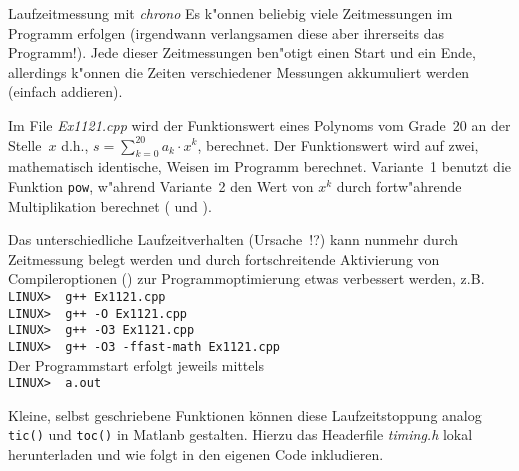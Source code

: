 %
{Laufzeitmessung mit \emph{chrono}}
%
Es k"onnen beliebig viele Zeitmessungen im Programm erfolgen 
(irgendwann verlangsamen diese aber ihrerseits das Programm!). 
Jede dieser Zeitmessungen ben"otigt einen Start und ein Ende, 
allerdings k"onnen die Zeiten verschiedener Messungen 
akkumuliert werden (einfach addieren).

Im File \textit{Ex1121.cpp}  
wird der Funktionswert eines Polynoms vom Grade~20 
an der Stelle~$x$ d.h., 
$s = \sum_{k=0}^{20} a_k \cdot x^k$, berechnet. 
Der Funktionswert wird auf zwei, mathematisch identische, Weisen im Programm berechnet. 
Variante~1 benutzt die Funktion \verb|pow|, w"ahrend 
Variante~2 den Wert von $x^k$ durch fortw"ahrende Multiplikation berechnet 
( und 
).  

Das unterschiedliche Laufzeitverhalten (Ursache~!?)
kann nunmehr durch 
Zeitmessung belegt werden und durch fortschreitende Aktivierung 
von Compileroptionen () 
zur Pro\-gramm\-op\-ti\-mie\-rung etwas verbessert werden, z.B. 
\\[0.5ex]
\verb|LINUX>  g++ Ex1121.cpp|	\\
\verb|LINUX>  g++ -O Ex1121.cpp|	\\
\verb|LINUX>  g++ -O3 Ex1121.cpp|	\\
\verb|LINUX>  g++ -O3 -ffast-math Ex1121.cpp|	
\\[0.5ex]
Der Programmstart erfolgt jeweils mittels 
\\[0.5ex]
\verb|LINUX>  a.out|
%
%

Kleine, selbst geschriebene Funktionen können diese Laufzeitstoppung 
analog \texttt{tic()} und \texttt{toc()} in Matlanb gestalten.
Hierzu das Headerfile \emph{timing.h}  lokal herunterladen 
und wie folgt in den eigenen Code inkludieren.

%
%
